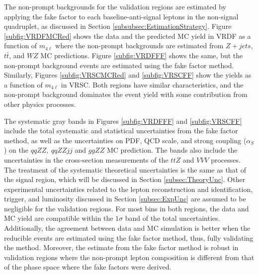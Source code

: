 The non-prompt backgrounds for the validation regions are estimated by applying the fake factor to each baseline-anti-signal leptons in the non-signal quadruplet, as discussed in Section \ref{subsubsec:EstimationStrategy}. Figure \ref{subfig:VRDFMCRed} shows the data and the predicted MC yield in VRDF as a function of $m_{4\ell}$ where the non-prompt backgrounds are estimated from $Z+jets$, $t\bar{t}$, and $WZ$ MC predictions. Figure \ref{subfig:VRDFFF} shows the same, but the non-prompt background events are estimated using the fake factor method. Similarly, Figures \ref{subfig:VRSCMCRed} and \ref{subfig:VRSCFF} show the yields as a function of $m_{4\ell}$ in VRSC. Both regions have similar characteristics, and the non-prompt background dominates the event yield with some contribution from other physics processes.

The systematic gray bands in Figures \ref{subfig:VRDFFF} and \ref{subfig:VRSCFF} include the total systematic and statistical uncertainties from the fake factor method, as well as the uncertainties on PDF, QCD scale, and strong coupling ($\alpha_{S}$) on the $qqZZ,~qqZZjj$ and $ggZZ$ MC prediction. The bands also include the uncertainties in the cross-section measurements of the $ttZ$ and $VVV$ processes. The treatment of the systematic theoretical uncertainties is the same as that of the signal region, which will be discussed in Section \ref{subsec:TheoryUnc}. Other experimental uncertainties related to the lepton reconstruction and identification, trigger, and luminosity discussed in Section \ref{subsec:ExpUnc} are assumed to be negligible for the validation regions. For most bins in both regions, the data and MC yield are compatible within the $1\sigma$ band of the total uncertainties. Additionally, the agreement between data and MC simulation is better when the reducible events are estimated using the fake factor method, thus, fully validating the method. Moreover, the estimate from the fake factor method is robust in validation regions where the non-prompt lepton composition is different from that of the phase space where the fake factors were derived.

